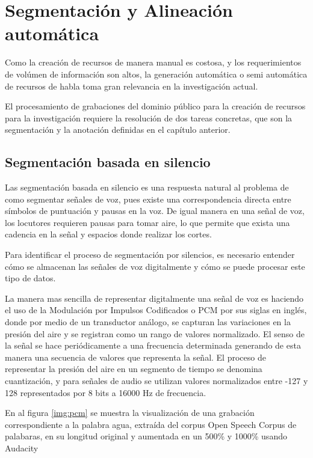 \chapter{Segmentación y Alineación automática}

Como la creación de recursos de manera manual es costosa, y los requerimientos de volúmen de información son altos, la generación automática o semi automática de recursos de habla toma gran relevancia en la investigación actual.

El procesamiento de grabaciones del dominio público para la creación de recursos para la investigación requiere la resolución de dos tareas concretas, que son la segmentación y la anotación definidas en el capítulo anterior.

\section{Segmentación basada en silencio}

Las segmentación basada en silencio es una respuesta natural al problema de como segmentar señales de voz, pues existe una correspondencia directa entre símbolos de puntuación y pausas en la voz. De igual manera en una señal de voz, los locutores requieren pausas para tomar aire, lo que permite que exista una cadencia en la señal y espacios donde realizar los cortes.

Para identificar el proceso de segmentación por silencios, es necesario entender cómo se almacenan las señales de voz digitalmente y cómo se puede procesar este tipo de datos.

La manera mas sencilla de representar digitalmente una señal de voz es haciendo el uso de la Modulación por Impulsos Codificados o PCM por sus siglas en inglés, donde por medio de un transductor análogo, se capturan las variaciones en la presión del aire y se registran como un rango de valores normalizado. El senso de la señal se hace periódicamente a una frecuencia determinada generando de esta manera una secuencia de valores que representa la señal. El proceso de representar la presión del aire en un segmento de tiempo se denomina cuantización, y para señales de audio se utilizan valores normalizados entre -127 y 128 representados por 8 bits a 16000 Hz de frecuencia.

En al figura \ref{img:pcm} se muestra la visualización de una grabación correspondiente a la palabra agua, extraída del corpus Open Speech Corpus de palabaras, en su longitud original y aumentada en un 500\% y 1000\% usando Audacity \cite{audacity}

